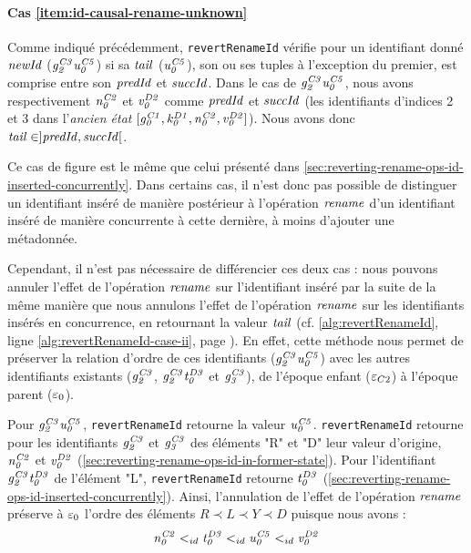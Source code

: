 \paragraph{Cas \ref{item:id-causal-rename-unknown}}

Comme indiqué précédemment, \texttt{revertRenameId} vérifie pour un identifiant donné $\mathit{newId}$ (\eg $\mathit{g}^{\mathit{C3}}_{\mathit{2}}\mathit{u}^{\mathit{C5}}_{\mathit{0}}$) si sa $\mathit{tail}$ ($\mathit{u}^{\mathit{C5}}_{\mathit{0}}$), \ie son ou ses tuples à l'exception du premier, est comprise entre son $\mathit{predId}$ et $\mathit{succId}$.
Dans le cas de $\mathit{g}^{\mathit{C3}}_{\mathit{2}}\mathit{u}^{\mathit{C5}}_{\mathit{0}}$, nous avons respectivement $\mathit{n}^{\mathit{C2}}_{\mathit{0}}$ et $\mathit{v}^{\mathit{D2}}_{\mathit{0}}$ comme $\mathit{predId}$ et $\mathit{succId}$ (les identifiants d'indices 2 et 3 dans l'\emph{ancien état} $[\mathit{g}^{\mathit{C1}}_{\mathit{0}},\mathit{k}^{\mathit{D1}}_{\mathit{0}},\mathit{n}^{\mathit{C2}}_{\mathit{0}},\mathit{v}^{\mathit{D2}}_{\mathit{0}}]$).
Nous avons donc $\mathit{tail} \in ]\mathit{predId},\mathit{succId}[$.

Ce cas de figure est le même que celui présenté dans \autoref{sec:reverting-rename-ops-id-inserted-concurrently}.
Dans certains cas, il n'est donc pas possible de distinguer un identifiant inséré de manière postérieur à l'opération $\mathit{rename}$ d'un identifiant inséré de manière concurrente à cette dernière, à moins d'ajouter une métadonnée.

Cependant, il n'est pas nécessaire de différencier ces deux cas : nous pouvons annuler l'effet de l'opération $\mathit{rename}$ sur l'identifiant inséré par la suite de la même manière que nous annulons l'effet de l'opération $\mathit{rename}$ sur les identifiants insérés en concurrence, \ie en retournant la valeur $\mathit{tail}$ (cf. \autoref{alg:revertRenameId}, ligne \ref{alg:revertRenameId-case-ii}, page \pageref{alg:revertRenameId-case-ii}).
En effet, cette méthode nous permet de préserver la relation d'ordre de ces identifiants ($\mathit{g}^{\mathit{C3}}_{\mathit{2}}\mathit{u}^{\mathit{C5}}_{\mathit{0}}$) avec les autres identifiants existants ($\mathit{g}^{\mathit{C3}}_{\mathit{2}}$, $\mathit{g}^{\mathit{C3}}_{\mathit{2}}\mathit{t}^{\mathit{D3}}_{\mathit{0}}$ et $\mathit{g}^{\mathit{C3}}_{\mathit{3}}$), de l'époque enfant ($\varepsilon_{C2}$) à l'époque parent ($\varepsilon_{0}$).

Pour $\mathit{g}^{\mathit{C3}}_{\mathit{2}}\mathit{u}^{\mathit{C5}}_{\mathit{0}}$, \texttt{revertRenameId} retourne la valeur $\mathit{u}^{\mathit{C5}}_{\mathit{0}}$.
\texttt{revertRenameId} retourne pour les identifiants $\mathit{g}^{\mathit{C3}}_{\mathit{2}}$ et $\mathit{g}^{\mathit{C3}}_{\mathit{3}}$ des éléments "R" et "D" leur valeur d'origine, $\mathit{n}^{\mathit{C2}}_{\mathit{0}}$ et $\mathit{v}^{\mathit{D2}}_{\mathit{0}}$ (\autoref{sec:reverting-rename-ops-id-in-former-state}).
Pour l'identifiant $\mathit{g}^{\mathit{C3}}_{\mathit{2}}\mathit{t}^{\mathit{D3}}_{\mathit{0}}$ de l'élément "L", \texttt{revertRenameId} retourne $\mathit{t}^{\mathit{D3}}_{\mathit{0}}$ (\autoref{sec:reverting-rename-ops-id-inserted-concurrently}).
Ainsi, l'annulation de l'effet de l'opération $\mathit{rename}$ préserve à $\varepsilon_{0}$ l'ordre des éléments $R \prec L \prec Y \prec D$ puisque nous avons :
\[ \mathit{n}^{\mathit{C2}}_{\mathit{0}} <_{id} \mathit{t}^{\mathit{D3}}_{\mathit{0}} <_{id} \mathit{u}^{\mathit{C5}}_{\mathit{0}} <_{id} \mathit{v}^{\mathit{D2}}_{\mathit{0}}\]

